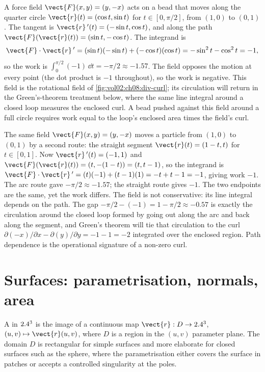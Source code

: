 \begin{example}
A force field $\vect{F}(x, y) = (y, -x)$ acts on a bead that moves
along the quarter circle $\vect{r}(t) = (\cos t, \sin t)$ for
$t \in [0, \pi/2]$, from $(1, 0)$ to $(0, 1)$. The tangent is
$\vect{r}\,'(t) = (-\sin t, \cos t)$, and along the path
$\vect{F}(\vect{r}(t)) = (\sin t, -\cos t)$. The integrand is
\[
\vect{F}\cdot\vect{r}\,' = (\sin t)(-\sin t) + (-\cos t)(\cos t)
= -\sin^{2} t - \cos^{2} t = -1,
\]
so the work is $\int_{0}^{\pi/2}(-1)\,\dd t = -\pi/2 \approx -1.57$.
The field opposes the motion at every point (the dot product is $-1$
throughout), so the work is negative. This field is the rotational
field of \cref{fig:vol02:ch08:div-curl}; its circulation will return
in the Green's-theorem treatment below, where the same line integral
around a closed loop measures the enclosed curl. A bead pushed
against this field around a full circle requires work equal to the
loop's enclosed area times the field's curl.
\end{example}

\begin{example}
The same field $\vect{F}(x, y) = (y, -x)$ moves a particle from
$(1, 0)$ to $(0, 1)$ by a second route: the straight segment
$\vect{r}(t) = (1 - t, t)$ for $t \in [0, 1]$. Now $\vect{r}\,'(t) =
(-1, 1)$ and $\vect{F}(\vect{r}(t)) = (t, -(1 - t)) = (t, t - 1)$, so
the integrand is $\vect{F}\cdot\vect{r}\,' = (t)(-1) + (t - 1)(1) =
-t + t - 1 = -1$, giving work $-1$. The arc route gave $-\pi/2
\approx -1.57$; the straight route gives $-1$. The two endpoints are
the same, yet the work differs. The field is not conservative: its
line integral depends on the path. The gap $-\pi/2 - (-1) = 1 -
\pi/2 \approx -0.57$ is exactly the circulation around the closed
loop formed by going out along the arc and back along the segment,
and Green's theorem will tie that circulation to the curl
$\partial(-x)/\partial x - \partial(y)/\partial y = -1 - 1 = -2$
integrated over the enclosed region. Path dependence is the
operational signature of a non-zero curl.
\end{example}

\section{Surfaces: parametrisation, normals, area}

A  in $2.4^{3}$ is the image of a
continuous map $\vect{r}: D \to \R^{3}$, $(u, v) \mapsto
\vect{r}(u, v)$, where $D$ is a region in the $(u, v)$ parameter
plane. The domain $D$ is rectangular for simple surfaces and more
elaborate for closed surfaces such as the sphere, where the
parametrisation either covers the surface in patches or accepts a
controlled singularity at the poles.

